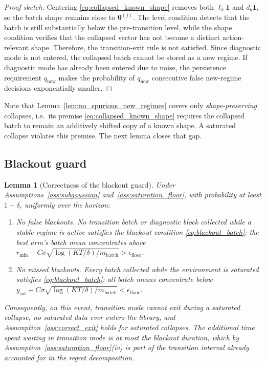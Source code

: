 \documentclass[11pt]{article}
\newtheorem{lemma}{Lemma}
\newcommand{\one}{\bm 1}
\begin{document}
\begin{proof}[Proof sketch]
Centering \eqref{eq:collapsed_known_shape} removes both $\ell_b\one$ and $d_b\one$, so the batch shape remains close to $\bm\theta^{(j)}$. The level condition detects that the batch is still substantially below the pre-transition level, while the shape condition verifies that the collapsed vector has not become a distinct action-relevant shape. Therefore, the transition-exit rule is not satisfied. Since diagnostic mode is not entered, the collapsed batch cannot be stored as a new regime. If diagnostic mode has already been entered due to noise, the persistence requirement $q_{\mathrm{new}}$ makes the probability of $q_{\mathrm{new}}$ consecutive false new-regime decisions exponentially smaller.
\end{proof}

Note that Lemma~\ref{lem:no_spurious_new_regimes} covers only \emph{shape-preserving} collapses, i.e.\ its premise \eqref{eq:collapsed_known_shape} requires the collapsed batch to remain an additively shifted copy of a known shape. A saturated collapse violates this premise. The next lemma closes that gap.

\subsection{Blackout guard}
\label{subsec:blackout_proof}

\begin{lemma}[Correctness of the blackout guard]
\label{lem:blackout_guard}
Under Assumptions~\ref{ass:subgaussian} and~\ref{ass:saturation_floor}, with probability at least $1-\delta$, uniformly over the horizon:
\begin{enumerate}
\item \emph{No false blackouts.} No transition batch or diagnostic block collected while a stable regime is active satisfies the blackout condition \eqref{eq:blackout_batch}: the best arm's batch mean concentrates above $r_{\min}-C\sigma\sqrt{\log(KT/\delta)/m_{\mathrm{batch}}}>\epsilon_{\mathrm{floor}}$.
\item \emph{No missed blackouts.} Every batch collected while the environment is saturated satisfies \eqref{eq:blackout_batch}: all batch means concentrate below $y_{\mathrm{sat}}+C\sigma\sqrt{\log(KT/\delta)/m_{\mathrm{batch}}}<\epsilon_{\mathrm{floor}}$.
\end{enumerate}
Consequently, on this event, transition mode cannot exit during a saturated collapse, no saturated data ever enters the library, and Assumption~\ref{ass:correct_exit} holds for saturated collapses. The additional time spent waiting in transition mode is at most the blackout duration, which by Assumption~\ref{ass:saturation_floor}(iv) is part of the transition interval already accounted for in the regret decomposition.
\end{lemma}
\end{document}
